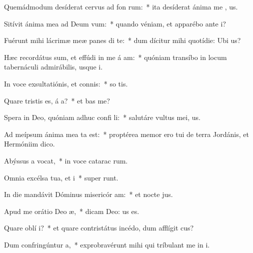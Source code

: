 \item Quemádmodum desíderat cervus ad fon rum:~* ita desíderat ánima me  , us.
\item Sitívit ánima mea ad Deum  vum:~* quando véniam, et apparébo ante  i?
\item Fuérunt mihi lácrimæ meæ panes di  te:~* dum dícitur mihi quotídie: Ubi   us?
\item Hæc recordátus sum, et effúdi in me á am:~* quóniam transíbo in locum tabernáculi admirábilis, usque   i.
\item In voce exsultatiónis, et connis:~* so tis.
\item Quare tristis es, á a?~* et  bas me?
\item Spera in Deo, quóniam adhuc confi li:~* salutáre vultus mei,   us.
\item Ad meípsum ánima mea ta est:~* proptérea memor ero tui de terra Jordánis, et Hermóniim   dico.
\item Abýssus a vocat,~* in voce catarac rum.
\item Omnia excélsa tua, et  i~* super  runt.
\item In die mandávit Dóminus misericór am:~* et nocte  jus.
\item Apud me orátio Deo  æ,~* dicam Deo:  us es.
\item Quare oblí  i?~* et quare contristátus incédo, dum afflígit  cus?
\item Dum confringúntur  a,~* exprobravérunt mihi qui tríbulant me in i.
